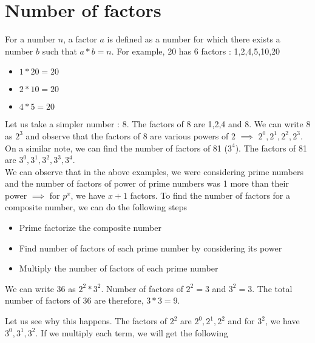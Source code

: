 \section{Number of factors}

For a number $n$, a factor $a$ is defined as a number for which there exists a number $b$ such that $a * b = n$. For example, 20 has 6 factors : 1,2,4,5,10,20

\begin{itemize}
    \item $1 * 20 = 20$
    \item $2 * 10 = 20$
    \item $4 * 5 = 20$
\end{itemize}

Let us take a simpler number : 8. The factors of 8 are 1,2,4 and 8. We can write 8 as $2^3$ and observe that the factors of 8 are various powers of 2 $\implies$ $2^0,2^1,2^2,2^3$. On a similar note, we can find the number of factors of 81 ($3^4$). The factors of 81 are $3^0,3^1,3^2,3^3,3^4$. \\

We can observe that in the above examples, we were considering prime numbers and the number of factors of power of prime numbers was 1 more than their power $\implies$ for $p^x$, we have $x+1$ factors. To find the number of factors for a composite number, we can do the following steps

\begin{itemize}
    \item Prime factorize the composite number
    \item Find number of factors of each prime number by considering its power
    \item Multiply the number of factors of each prime number
\end{itemize}


We can write 36 as $2^2 * 3^2$. Number of factors of $2^2 = 3$ and $3^2 = 3$. The total number of factors of 36 are therefore, $3 * 3 = 9$. 

Let us see why this happens. The factors of $2^2$ are $2^0,2^1,2^2$ and for $3^2$, we have $3^0,3^1,3^2$. If we multiply each term, we will get the following


